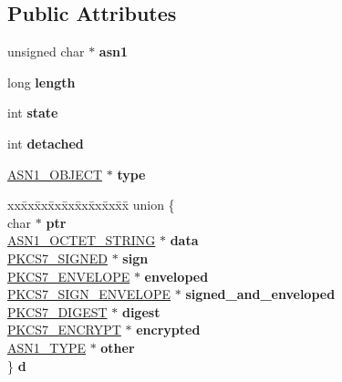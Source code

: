 \subsection*{Public Attributes}
\begin{DoxyCompactItemize}
\item 
\mbox{\label{structpkcs7__st_a18322feb5e9ce542d1bdc4b7f3adb30d}} 
unsigned char $\ast$ {\bfseries asn1}
\item 
\mbox{\label{structpkcs7__st_a565b91c0f8c20b54770879e006bd41ee}} 
long {\bfseries length}
\item 
\mbox{\label{structpkcs7__st_a347c4591ec3bcf75f4dd86b430b20426}} 
int {\bfseries state}
\item 
\mbox{\label{structpkcs7__st_aaefed5b8e3dc5995f7fb1e1a300b7668}} 
int {\bfseries detached}
\item 
\mbox{\label{structpkcs7__st_aa129fb1eed0ea85896818973f1c17304}} 
\hyperlink{structasn1__object__st}{A\+S\+N1\+\_\+\+O\+B\+J\+E\+CT} $\ast$ {\bfseries type}
\item 
\mbox{\label{structpkcs7__st_a9c810de454a9678f27056d60e46fedc2}} 
\begin{tabbing}
xx\=xx\=xx\=xx\=xx\=xx\=xx\=xx\=xx\=\kill
union \{\\
\>char $\ast$ {\bfseries ptr}\\
\>\hyperlink{structasn1__string__st}{ASN1\_OCTET\_STRING} $\ast$ {\bfseries data}\\
\>\hyperlink{structpkcs7__signed__st}{PKCS7\_SIGNED} $\ast$ {\bfseries sign}\\
\>\hyperlink{structpkcs7__enveloped__st}{PKCS7\_ENVELOPE} $\ast$ {\bfseries enveloped}\\
\>\hyperlink{structpkcs7__signedandenveloped__st}{PKCS7\_SIGN\_ENVELOPE} $\ast$ {\bfseries signed\_and\_enveloped}\\
\>\hyperlink{structpkcs7__digest__st}{PKCS7\_DIGEST} $\ast$ {\bfseries digest}\\
\>\hyperlink{structpkcs7__encrypted__st}{PKCS7\_ENCRYPT} $\ast$ {\bfseries encrypted}\\
\>\hyperlink{structasn1__type__st}{ASN1\_TYPE} $\ast$ {\bfseries other}\\
\} {\bfseries d}\\


\end{tabbing}
\end{DoxyCompactItemize}
